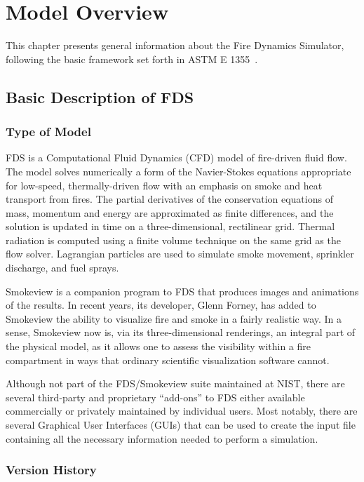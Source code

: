 \documentclass[11pt]{book}
\begin{document}
\chapter{Model Overview}

This chapter presents general information about the Fire Dynamics Simulator, following the basic framework set forth in
ASTM E 1355~\cite{ASTM:E1355}.

\section{Basic Description of FDS}


\subsection{Type of Model}

FDS is a Computational Fluid Dynamics (CFD) model of fire-driven fluid flow.
The model solves numerically a form of the Navier-Stokes equations appropriate
for low-speed, thermally-driven flow with an emphasis on smoke and heat transport
from fires. The partial derivatives of the conservation equations of mass, momentum and energy are approximated
as finite differences, and the solution is updated in time on a three-dimensional, rectilinear grid.
Thermal radiation is computed using a finite volume technique on the same grid as the flow solver.
Lagrangian particles are used to simulate smoke movement, sprinkler discharge, and fuel sprays.

Smokeview is a companion program to FDS that produces images and animations of the results. In recent years, its developer, Glenn Forney, has
added to Smokeview the ability to visualize fire and smoke in a fairly realistic way. In a sense, Smokeview now is, via its three-dimensional
renderings, an integral part of the physical model, as it allows one to assess the visibility within a fire compartment in ways that ordinary
scientific visualization software cannot.

Although not part of the FDS/Smokeview suite maintained at NIST, there are several third-party and proprietary ``add-ons'' to FDS either available
commercially or privately maintained by individual users. Most notably, there are several Graphical User Interfaces (GUIs) that can be used
to create the input file containing all the necessary information needed to perform a simulation.



\subsection{Version History}
\end{document}

